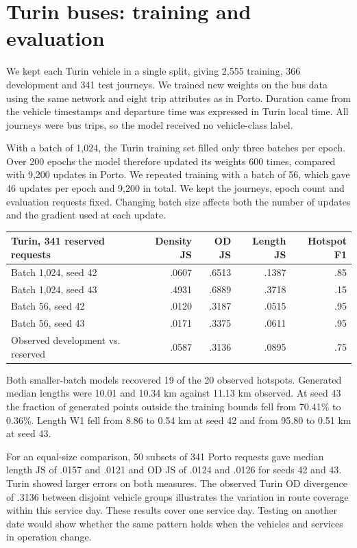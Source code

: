\documentclass[11pt,a4paper]{article}
\begin{document}
\newpage
\section*{Turin buses: training and evaluation}
We kept each Turin vehicle in a single split, giving 2,555 training, 366 development and 341 test journeys. We trained new weights on the bus data using the same network and eight trip attributes as in Porto. Duration came from the vehicle timestamps and departure time was expressed in Turin local time. All journeys were bus trips, so the model received no vehicle-class label.

With a batch of 1,024, the Turin training set filled only three batches per epoch. Over 200 epochs the model therefore updated its weights 600 times, compared with 9,200 updates in Porto. We repeated training with a batch of 56, which gave 46 updates per epoch and 9,200 in total. We kept the journeys, epoch count and evaluation requests fixed. Changing batch size affects both the number of updates and the gradient used at each update.

\begin{center}\small
\begin{tabular}{lrrrr}\toprule
Turin, 341 reserved requests & Density JS & OD JS & Length JS & Hotspot F1\\\midrule
Batch 1,024, seed 42 & .0607 & .6513 & .1387 & .85\\
Batch 1,024, seed 43 & .4931 & .6889 & .3718 & .15\\
Batch 56, seed 42 & .0120 & .3187 & .0515 & .95\\
Batch 56, seed 43 & .0171 & .3375 & .0611 & .95\\
Observed development vs. reserved & .0587 & .3136 & .0895 & .75\\\bottomrule
\end{tabular}\end{center}

Both smaller-batch models recovered 19 of the 20 observed hotspots. Generated median lengths were 10.01 and 10.34 km against 11.13 km observed. At seed 43 the fraction of generated points outside the training bounds fell from 70.41\% to 0.36\%. Length W1 fell from 8.86 to 0.54 km at seed 42 and from 95.80 to 0.51 km at seed 43.

For an equal-size comparison, 50 subsets of 341 Porto requests gave median length JS of .0157 and .0121 and OD JS of .0124 and .0126 for seeds 42 and 43. Turin showed larger errors on both measures. The observed Turin OD divergence of .3136 between disjoint vehicle groups illustrates the variation in route coverage within this service day. These results cover one service day. Testing on another date would show whether the same pattern holds when the vehicles and services in operation change.
\end{document}
